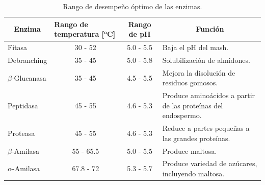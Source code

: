              \begin{table}[ht]
                \begin{center}
                    \begin{tabular}{|m{3cm}|m{2.2cm}|m{1.4cm}|m{7cm}|}
                     \hline
                     \multicolumn{1}{|c|}{Enzima} & Rango de temperatura [°C] & \multicolumn{1}{|c|}{Rango de pH} & \multicolumn{1}{|c|}{Función} \\
                     \hline \hline
                     
                     Fitasa & 
                     \multicolumn{1}{|c|}{30 - 52} & 
                     \multicolumn{1}{|c|}{5.0 - 5.5} &
                     Baja el pH del mash.\\\hline
                     
                     Debranching & 
                     \multicolumn{1}{|c|}{35 - 45} & 
                     \multicolumn{1}{|c|}{5.0 - 5.8} & Solubilización de almidones. \\\hline
                     
                     $\beta$-Glucanasa & \multicolumn{1}{|c|}{35 - 45} & 
                     \multicolumn{1}{|c|}{4.5 - 5.5} &
                     Mejora la disolución de residuos gomosos. \\\hline
                     
                     Peptidasa & 
                     \multicolumn{1}{|c|}{45 - 55} & 
                     \multicolumn{1}{|c|}{4.6 - 5.3} & Produce aminoácidos a partir de las proteínas del endospermo.\\\hline %
                     
                     Proteasa & 
                     \multicolumn{1}{|c|}{45 - 55} & 
                     \multicolumn{1}{|c|}{4.6 - 5.3}&
                     Reduce a partes pequeñas a las grandes proteínas.\\\hline
                     
                    $\beta$-Amilasa & 
                    \multicolumn{1}{|c|}{55 - 65.5} & 
                    \multicolumn{1}{|c|}{5.0 - 5.5} & 
                    Produce maltosa. \\\hline
                     
                    $\alpha$-Amilasa & \multicolumn{1}{|c|}{67.8 - 72} & 
                    \multicolumn{1}{|c|}{5.3 - 5.7} & 
                    Produce variedad de azúcares, incluyendo maltosa.\\ \hline
            \end{tabular}
            \caption{Rango de desempeño óptimo de las enzimas. \cite{Palmer}}
            \label{tablaEnzimas}
            \end{center}
        \end{table}
        
